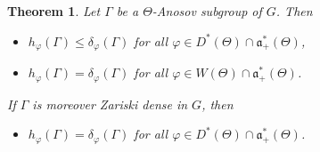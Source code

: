 \documentclass[10pt,a4paper]{article}
\newtheorem{theo}{Theorem}[section]
\theoremstyle{definition}
\newcommand{\fa}{\mathfrak{a}}
\let\phi\varphi
\let\G\Gamma
\begin{document}
\begin{theo} \label{theo-GeneralComparisonEntropyCriticalExponent}
Let $\Gamma$ be a $\Theta$-Anosov subgroup of $G$. Then
\begin{itemize}
\item $h_\phi(\Gamma) \leq \delta_\phi(\Gamma)$ for all $\phi\in D^*(\Theta)\cap \fa_+^*(\Theta)$,
\item $h_\phi(\Gamma) = \delta_\phi(\Gamma)$ for all $\phi \in W(\Theta)\cap \fa_+^*(\Theta)$.
\end{itemize}

If $\G$ is moreover Zariski dense in $G$, then
\begin{itemize}
\item $h_\phi(\G) =\delta_\phi(\G)$ for all $\phi \in D^*(\Theta)\cap \fa_+^*(\Theta)$.
\end{itemize}
\end{theo}
\end{document}
